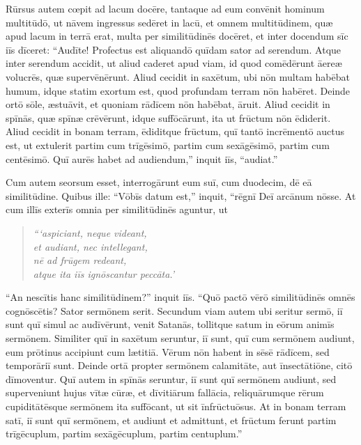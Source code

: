 \Caput
\Versus Rūrsus autem cœpit ad lacum docēre, tantaque ad eum convēnit hominum multitūdō, ut nāvem ingressus sedēret in lacū, et omnem multitūdinem, quæ apud lacum in terrā erat,
\Versus multa per similitūdinēs docēret, et inter docendum sīc iīs dīceret:
\Versus ``Audīte! Profectus est aliquandō quīdam sator ad serendum.
\Versus Atque inter serendum accidit, ut aliud caderet apud viam, id quod comēdērunt āereæ volucrēs, quæ supervēnērunt.
\Versus Aliud cecidit in saxētum, ubi nōn multam habēbat humum, idque statim exortum est, quod profundam terram nōn habēret.
\Versus Deinde ortō sōle, æstuāvit, et quoniam rādīcem nōn habēbat, āruit.
\Versus Aliud cecidit in spīnās, quæ spīnæ crēvērunt, idque suffōcārunt, ita ut frūctum nōn ēdiderit.
\Versus Aliud cecidit in bonam terram, ēdiditque frūctum, quī tantō incrēmentō auctus est, ut extulerit partim cum trīgēsimō, partim cum sexāgēsimō, partim cum centēsimō.
\Versus Quī aurēs habet ad audiendum,'' inquit iīs, ``audiat.''

\Versus Cum autem seorsum esset, interrogārunt eum suī, cum duodecim, dē eā similitūdine.
\Versus Quibus ille: ``Vōbīs datum est,'' inquit, ``rēgnī Deī arcānum nōsse. At cum illīs exterīs omnia per similitūdinēs aguntur,
\Versus ut 

\begin{verse}
\begin{patverse*}
\emph{```aspiciant, neque videant,\\
et audiant, nec intellegant,\\
nē ad frūgem redeant,\\
atque ita iīs ignōscantur peccāta.'}
\end{patverse*}
\end{verse}

\Versus ``An nescītis hanc similitūdinem?'' inquit iīs. ``Quō pactō vērō similitūdinēs omnēs cognōscētis?
\Versus Sator sermōnem serit.
\Versus Secundum viam autem ubi seritur sermō, iī sunt quī simul ac audīvērunt, venit Satanās, tollitque satum in eōrum animīs sermōnem.
\Versus Similiter quī in saxētum seruntur, iī sunt, quī cum sermōnem audiunt, eum prōtinus accipiunt cum lætitiā.
\Versus Vērum nōn habent in sēsē rādīcem, sed temporāriī sunt. Deinde ortā propter sermōnem calamitāte, aut īnsectātiōne, citō dīmoventur.
\Versus Quī autem in spīnās seruntur, iī sunt quī sermōnem audiunt,
\Versus sed superveniunt hujus vītæ cūræ, et dīvitiārum fallācia, reliquārumque rērum cupiditātēsque sermōnem ita suffōcant, ut sit īnfrūctuōsus.
\Versus At in bonam terram satī, iī sunt quī sermōnem, et audiunt et admittunt, et frūctum ferunt partim trīgēcuplum, partim sexāgēcuplum, partim centuplum.''


